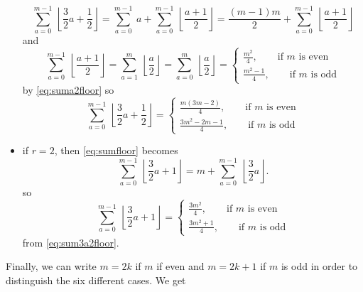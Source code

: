 \begin{itemize}
\begin{equation}
                \sum^{m-1}_{a=0}~\left\lfloor \frac{3}{2}a+\frac{1}{2}\right\rfloor = \sum^{m-1}_{a=0}~a+\sum^{m-1}_{a=0}~\left\lfloor \frac{a+1}{2}\right\rfloor = \frac{(m-1)m}{2}+\sum^{m-1}_{a=0}~\left\lfloor \frac{a+1}{2}\right\rfloor
            \end{equation}
            and
            \begin{equation}
                \sum^{m-1}_{a=0}~\left\lfloor \frac{a+1}{2}\right\rfloor = \sum^{m}_{a=1}~\left\lfloor \frac{a}{2}\right\rfloor = \sum^{m}_{a=0}~\left\lfloor \frac{a}{2}\right\rfloor =  
                \begin{cases}
                    \frac{m^2}{4},\qquad\text{if $m$ is even}\\
                    \frac{m^2-1}{4},\qquad\text{if $m$ is odd}
                \end{cases}
            \end{equation}
            by \eqref{eq:suma2floor} so
            \begin{equation}
                \sum^{m-1}_{a=0}~\left\lfloor \frac{3}{2}a+\frac{1}{2}\right\rfloor=
                \begin{cases}
                    \frac{m(3m-2)}{4},\qquad\text{if $m$ is even}\\
                    \frac{3m^2-2m-1}{4},\qquad\text{if $m$ is odd}
                \end{cases}
            \end{equation}
            \item if $r=2$, then \eqref{eq:sumfloor} becomes
            \begin{equation}
                \sum^{m-1}_{a=0}~\left\lfloor \frac{3}{2}a+1\right\rfloor = m+\sum^{m-1}_{a=0}~\left\lfloor \frac{3}{2}a\right\rfloor.
            \end{equation}
            so
            \begin{equation}
                \sum^{m-1}_{a=0}~\left\lfloor \frac{3}{2}a+1\right\rfloor=
                \begin{cases}
                    \frac{3m^2}{4},\qquad\text{if $m$ is even}\\
                    \frac{3m^2+1}{4},\qquad\text{if $m$ is odd}
                \end{cases}
            \end{equation}
            from \eqref{eq:sum3a2floor}.
        \end{itemize}
        Finally, we can write $m=2k$ if $m$ if even and $m=2k+1$ if $m$ is odd in order to distinguish the six different cases. We get
